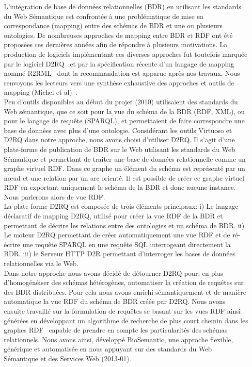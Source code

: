 L'intégration de base de données relationnelles (BDR) en utilisant les standards du Web Sémantique est confrontée à une problématique de mise en correspondance (mapping) entre des schémas de BDR et une ou plusieurs ontologies. De nombreuses approches de mapping entre BDR et RDF ont été proposées ces dernières années afin de répondre à plusieurs motivations. La production de logiciels implémentant ces diverses approches fut toutefois marquée par le logiciel D2RQ~\cite{Bizer2003,Bizer2004} et par la spécification récente d’un langage de mapping nommé R2RML~\cite{Souripriya} dont la recommandation est apparue après nos travaux. Nous renvoyons les lecteurs vers une synthèse exhaustive des approches et outils de mapping (Michel et al)~\cite{Antipolis2014}.\\

Peu d’outils disponibles au début du projet (2010) utilisaient des standards du Web sémantique, que ce soit pour la vue du schéma de la BDR (RDF, XML), ou pour le langage de requête (SPARQL), et permettaient de faire correspondre une base de données avec plus d’une ontologie. Considérant les outils Virtuoso et D2RQ dans notre approche, nous avons choisi d'utiliser D2RQ. Il s'agit d'une plate-forme de publication de BDR sur le Web utilisant les standards du Web Sémantique et permettant de traiter une base de données relationnelle comme un graphe virtuel RDF. Dans ce graphe un élément du schéma est représenté par un n\oe ud et une relation par un arc orienté. Il est possible de créer ce graphe virtuel RDF en exportant uniquement le schéma de la BDR et donc aucune instance. Nous parlerons alors de vue RDF. \\

La plate-forme D2RQ est composée de trois éléments principaux: i) Le langage déclaratif de mapping D2RQ, utilisé pour créer la vue RDF de la BDR et permettant de décrire les relations entre des ontologies et un schéma de BDR. ii) Le moteur D2RQ permettant de créer automatiquement une vue RDF et de ré-écrire une requête SPARQL en une requête SQL interrogeant directement la BDR. iii) le Serveur HTTP D2R permettant d’interroger les bases de données relationnelles via le Web.\\

Dans notre approche nous avons décidé de détourner D2RQ pour, en plus d'homogénéiser des schémas hétérogènes, automatiser la création de requêtes sur des BDR distribuées. Pour cela nous avons enrichi sémantiquement et de manière automatique la vue RDF du schéma de BDR créée par D2RQ. Nous avons ensuite travaillé sur la formulation de requêtes se basant sur les vues RDF ainsi générées en développant un algorithme de recherche de plus court chemin dans les graphes RDF~\cite{wollbrett2013clever} capable de prendre en compte les particularités des schémas relationnels. Nous avons ainsi, développé BioSemantic, une approche flexible, générique et automatisée en nous appuyant sur des standards du Web Sémantique et des Services Web (2013-01). \\

